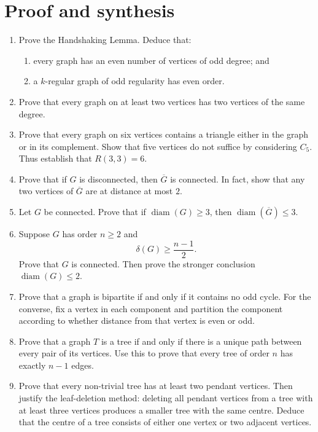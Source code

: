 \documentclass[svgnames]{amsart}
\newcommand{\comp}[1]{\overline{#1}}
\newcommand{\diam}{\operatorname{diam}}
\begin{document}
\section*{Proof and synthesis}

\begin{enumerate}[resume]

\item Prove the Handshaking Lemma. Deduce that:
\begin{enumerate}
  \item every graph has an even number of vertices of odd degree; and
  \item a $k$-regular graph of odd regularity has even order.
\end{enumerate}

\item Prove that every graph on at least two vertices has two vertices of the same degree.

\item Prove that every graph on six vertices contains a triangle either in the graph or in its complement. Show that five vertices do not suffice by considering $C_5$. Thus establish that $R(3,3)=6$.

\item Prove that if $G$ is disconnected, then $\comp G$ is connected. In fact, show that any two vertices of $\comp G$ are at distance at most $2$.

\item Let $G$ be connected. Prove that if $\diam(G)\geq 3$, then $\diam(\comp G)\leq 3$.

\item Suppose $G$ has order $n\geq2$ and
\begin{equation*}
\delta(G)\geq \frac{n-1}{2}.
\end{equation*}
Prove that $G$ is connected. Then prove the stronger conclusion $\diam(G)\leq2$.

\item Prove that a graph is bipartite if and only if it contains no odd cycle. For the converse, fix a vertex in each component and partition the component according to whether distance from that vertex is even or odd.

\item Prove that a graph $T$ is a tree if and only if there is a unique path between every pair of its vertices. Use this to prove that every tree of order $n$ has exactly $n-1$ edges.

\item Prove that every non-trivial tree has at least two pendant vertices. Then justify the leaf-deletion method: deleting all pendant vertices from a tree with at least three vertices produces a smaller tree with the same centre. Deduce that the centre of a tree consists of either one vertex or two adjacent vertices.


\end{enumerate}
\end{document}
